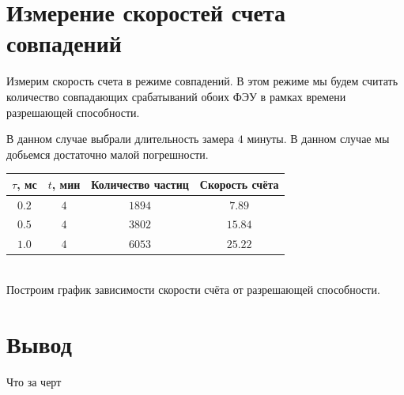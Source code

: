 \documentclass[12pt]{article}
\begin{document}
  \section{Измерение скоростей счета совпадений}

    Измерим скорость счета в режиме совпадений. В этом режиме мы будем считать
    количество совпадающих срабатываний обоих ФЭУ в рамках времени разрешающей
    способности.

    В данном случае выбрали длительность замера $4$ минуты. В данном случае мы
    добьемся достаточно малой погрешности. \\

    \begin{tabular}{ || c || c | c | c ||}
      \hline
      $\tau$, мс & $t$, мин & Количество частиц & Скорость счёта \\ \hline
      $0.2$ & $4$ & $1894$ & $7.89$ \\
      $0.5$ & $4$ & $3802$ & $15.84$ \\
      $1.0$ & $4$ & $6053$ & $25.22$ \\
      \hline
    \end{tabular} \\

    Построим график зависимости скорости счёта от разрешающей способности.

    \begin{figure}[h!]
      \begin{minipage}[h]{0.6\linewidth}
      \end{minipage}
      \label{plot}
    \end{figure}

  \section{Вывод}

    Что за черт
\end{document}
